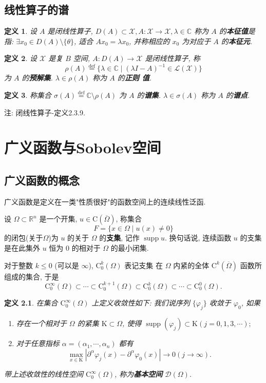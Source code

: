 \documentclass{ctexrep}
\newtheorem{defn}{定义}[section]
\newcommand{\X}{\mathscr{X}}
\newcommand{\SCRL}{\mathscr{L}}
\newcommand{\D}{\mathscr{D}}
\newcommand{\C}{\mathbb{C}}
\newcommand{\R}{\mathbb{R}}
\newcommand{\abs}[1]{\left\lvert#1\right\rvert}
\newcommand{\CRM}{\mathrm{C}}
\DeclareMathOperator{\supp}{supp}
\begin{document}
\section{线性算子的谱}
\begin{defn}
设 $A$ 是闭线性算子, $D(A)\subset \X, A : \X \to \X, \lambda \in \C$
称为 $A$ 的\textbf{本征值}是指: $\exists x_0 \in D(A) \setminus \{\theta\}$, 适合
$Ax_0 = \lambda x_0$, 并称相应的 $x_0$ 为对应于 $A$ 的\textbf{本征元}.
\end{defn}

\begin{defn}
设 $\X$ 是复 $B$ 空间, $A : D(A) \to \X$ 是闭线性算子, 称
\[
\rho(A) \overset{\text{def}}{=} \{\lambda \in \C \mid (\lambda I -
A)^{-1} \in \SCRL(\X)\}
\]
为 $A$ 的\textbf{预解集}. $\lambda \in \rho(A)$ 称为 $A$ 的\textbf{正则
  值}.
\end{defn}

\begin{defn}
称集合 $\sigma(A) \overset{\text{def}}{=} \C \setminus \rho(A)$ 为 $A$
的\textbf{谱集}. $\lambda \in \sigma(A)$ 称为 $A$ 的\textbf{谱点}.
\end{defn}

注: 闭线性算子-定义2.3.9.

\chapter{广义函数与Sobolev空间}

\section{广义函数的概念}

广义函数是定义在一类"性质很好"的函数空间上的连续线性泛函.

设 $\Omega \subset \R^n$ 是一个开集, $u \in \CRM(\overline{\Omega})$,
称集合
\[
F = \{x \in \Omega \mid u(x) \neq 0\}
\]
的闭包(关于$\Omega$)为 $u$ 的关于 $\Omega$ 的\textbf{支集}, 记作
$\supp{u}$. 换句话说, 连续函数 $u$ 的支集是在此集外 $u$ 恒为 $0$ 的相对于
$\Omega$ 的最小闭集.

对于整数 $k \le 0$ (可以是 $\infty$), $\CRM^k_0(\Omega)$ 表记支集
在 $\Omega$ 内紧的全体 $\CRM^k(\overline{\Omega})$ 函数所组成的集合,
于是
\[
\CRM^\infty_0(\Omega) \subset \cdots \subset \CRM^{k+1}_0(\Omega)
\subset \CRM^k_0(\Omega) \subset \cdots \subset \CRM^0_0(\Omega).
\]

\begin{defn}
在集合 $\CRM^\infty_0(\Omega)$ 上定义收敛性如下: 我们说序列
$\{\varphi_j\}$ 收敛于 $\varphi_0$, 如果
\renewcommand{\labelenumi}{(\theenumi)}
\begin{enumerate}
\item 存在一个相对于 $\Omega$ 的紧集 $\mathrm{K} \subset \Omega$, 使得
  $\supp{(\varphi_j)} \subset \mathrm{K} (j = 0, 1, 3, \cdots);$
\item 对于任意指标 $\alpha = (\alpha_1, \cdots, \alpha_n)$ 都有
\[
\max_{x\in \mathrm{K}}{\abs{\partial^\alpha\varphi_j(x)
    - \partial^\alpha\varphi_0(x)}} \rightarrow 0 (j \rightarrow \infty).
\]
\end{enumerate}
带上述收敛性的线性空间 $\CRM^\infty_0(\Omega)$, 称为\textbf{基本空间} $\D(\Omega)$.
\end{defn}
\end{document}
